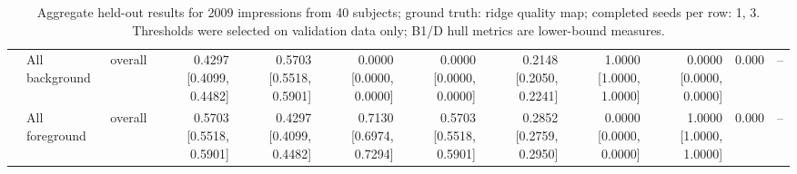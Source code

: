 \begin{table}[t]
\begin{tabular}{lllrrrrrrrrr}
 & All background & overall & 0.4297 [0.4099, 0.4482] & 0.5703 [0.5518, 0.5901] & 0.0000 [0.0000, 0.0000] & 0.0000 [0.0000, 0.0000] & 0.2148 [0.2050, 0.2241] & 1.0000 [1.0000, 1.0000] & 0.0000 [0.0000, 0.0000] & 0.000 & -- \\
 & All foreground & overall & 0.5703 [0.5518, 0.5901] & 0.4297 [0.4099, 0.4482] & 0.7130 [0.6974, 0.7294] & 0.5703 [0.5518, 0.5901] & 0.2852 [0.2759, 0.2950] & 0.0000 [0.0000, 0.0000] & 1.0000 [1.0000, 1.0000] & 0.000 & -- \\
\bottomrule
\end{tabular}
\caption{Aggregate held-out results for 2009 impressions from 40 subjects; ground truth: ridge quality map; completed seeds per row: 1, 3. Thresholds were selected on validation data only; B1/D hull metrics are lower-bound measures.}
\end{table}
